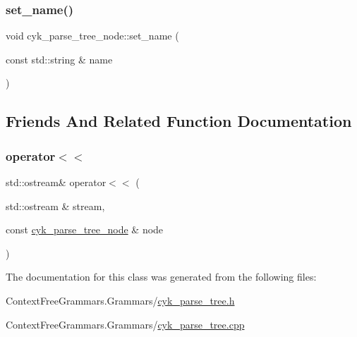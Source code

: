\mbox{\label{classcyk__parse__tree__node_aec106b63ae6859480875ba5edf33e347}} 
\subsubsection{\texorpdfstring{set\_name()}{set\_name()}}
{\footnotesize\ttfamily void cyk\+\_\+parse\+\_\+tree\+\_\+node\+::set\+\_\+name (\begin{DoxyParamCaption}\item[{const std\+::string \&}]{name }\end{DoxyParamCaption})}



\subsection{Friends And Related Function Documentation}
\mbox{\label{classcyk__parse__tree__node_a6a338e8d2d8c83ce89dc81dec7f9cfb6}} 
\subsubsection{\texorpdfstring{operator$<$$<$}{operator<<}}
{\footnotesize\ttfamily std\+::ostream\& operator$<$$<$ (\begin{DoxyParamCaption}\item[{std\+::ostream \&}]{stream,  }\item[{const \mbox{\hyperlink{classcyk__parse__tree__node}{cyk\+\_\+parse\+\_\+tree\+\_\+node}} \&}]{node }\end{DoxyParamCaption})\hspace{0.3cm}{\ttfamily [friend]}}



The documentation for this class was generated from the following files\+:\begin{DoxyCompactItemize}
\item 
Context\+Free\+Grammars.\+Grammars/\mbox{\hyperlink{cyk__parse__tree_8h}{cyk\+\_\+parse\+\_\+tree.\+h}}\item 
Context\+Free\+Grammars.\+Grammars/\mbox{\hyperlink{cyk__parse__tree_8cpp}{cyk\+\_\+parse\+\_\+tree.\+cpp}}\end{DoxyCompactItemize}
